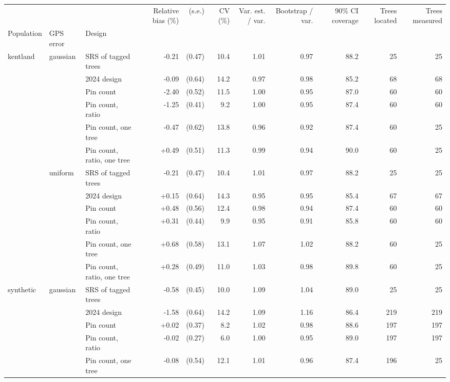 \begin{tabular}{lll|rr|r|rr|r|rr}
\toprule
 &  &  & Relative bias (\%) & (s.e.) & CV (\%) & Var. est. / var. & Bootstrap / var. & 90\% CI coverage & Trees located & Trees measured \\
Population & GPS error & Design &  &  &  &  &  &  &  &  \\
\midrule
\multirow[t]{12}{*}{kentland} & \multirow[t]{6}{*}{gaussian} & SRS of tagged trees & -0.21 & (0.47) & 10.4 & 1.01 & 0.97 & 88.2 & 25 & 25 \\
 &  & 2024 design & -0.09 & (0.64) & 14.2 & 0.97 & 0.98 & 85.2 & 68 & 68 \\
 &  & Pin count & -2.40 & (0.52) & 11.5 & 1.00 & 0.95 & 87.0 & 60 & 60 \\
 &  & Pin count, ratio & -1.25 & (0.41) & 9.2 & 1.00 & 0.95 & 87.4 & 60 & 60 \\
 &  & Pin count, one tree & -0.47 & (0.62) & 13.8 & 0.96 & 0.92 & 87.4 & 60 & 25 \\
 &  & Pin count, ratio, one tree & +0.49 & (0.51) & 11.3 & 0.99 & 0.94 & 90.0 & 60 & 25 \\
\cline{2-11}
 & \multirow[t]{6}{*}{uniform} & SRS of tagged trees & -0.21 & (0.47) & 10.4 & 1.01 & 0.97 & 88.2 & 25 & 25 \\
 &  & 2024 design & +0.15 & (0.64) & 14.3 & 0.95 & 0.95 & 85.4 & 67 & 67 \\
 &  & Pin count & +0.48 & (0.56) & 12.4 & 0.98 & 0.94 & 87.4 & 60 & 60 \\
 &  & Pin count, ratio & +0.31 & (0.44) & 9.9 & 0.95 & 0.91 & 85.8 & 60 & 60 \\
 &  & Pin count, one tree & +0.68 & (0.58) & 13.1 & 1.07 & 1.02 & 88.2 & 60 & 25 \\
 &  & Pin count, ratio, one tree & +0.28 & (0.49) & 11.0 & 1.03 & 0.98 & 89.8 & 60 & 25 \\
\cline{1-11} \cline{2-11}
\multirow[t]{12}{*}{synthetic} & \multirow[t]{6}{*}{gaussian} & SRS of tagged trees & -0.58 & (0.45) & 10.0 & 1.09 & 1.04 & 89.0 & 25 & 25 \\
 &  & 2024 design & -1.58 & (0.64) & 14.2 & 1.09 & 1.16 & 86.4 & 219 & 219 \\
 &  & Pin count & +0.02 & (0.37) & 8.2 & 1.02 & 0.98 & 88.6 & 197 & 197 \\
 &  & Pin count, ratio & -0.02 & (0.27) & 6.0 & 1.00 & 0.95 & 89.0 & 197 & 197 \\
 &  & Pin count, one tree & -0.08 & (0.54) & 12.1 & 1.01 & 0.96 & 87.4 & 196 & 25 \\

\end{tabular}
